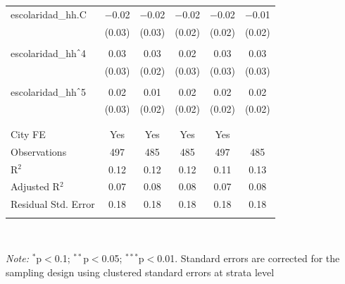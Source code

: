 \begin{table}[H]
\begin{tabularx}{0.9\textwidth}{@{\extracolsep{-7pt}}lccccc}
\\   escolaridad\_hh.C & $-$0.02 & $-$0.02 & $-$0.02 & $-$0.02 & $-$0.01 \\    & (0.03) & (0.03) & (0.02) & (0.02) & (0.02) \\    & & & & & \\   escolaridad\_hh$\hat{\mkern6mu}$4 & 0.03 & 0.03 & 0.02 & 0.03 & 0.03 \\    & (0.03) & (0.02) & (0.03) & (0.03) & (0.03) \\    & & & & & \\   escolaridad\_hh$\hat{\mkern6mu}$5 & 0.02 & 0.01 & 0.02 & 0.02 & 0.02 \\    & (0.03) & (0.02) & (0.02) & (0.02) & (0.02) \\    & & & & & \\  \hline \\[-1.8ex]  City FE & Yes & Yes & Yes & Yes &  \\  Observations & 497 & 485 & 485 & 497 & 485 \\  R$^{2}$ & 0.12 & 0.12 & 0.12 & 0.11 & 0.13 \\  Adjusted R$^{2}$ & 0.07 & 0.08 & 0.08 & 0.07 & 0.08 \\  Residual Std. Error & 0.18 & 0.18 & 0.18 & 0.18 & 0.18 \\  \hline  \hline \\[-1.8ex]  \end{tabularx} \\ \parbox[]{\textwidth}{\textit{Note:} $^{*}$p$<$0.1; $^{**}$p$<$0.05; $^{***}$p$<$0.01. Standard errors are corrected for the sampling design using clustered standard errors at strata level }  \end{table} 